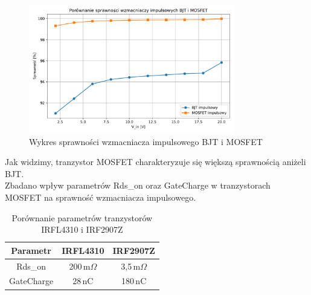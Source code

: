 \documentclass[11pt]{article}
\begin{document}
\begin{figure}[H]
\centering
\includegraphics[width=0.8\textwidth]{aun1_imp_bjt_vs_mosfet.pdf}
\caption{Wykres sprawności wzmacniacza impulsowego BJT i MOSFET}
\end{figure}

Jak widzimy, tranzystor MOSFET charakteryzuje się większą sprawnością aniżeli BJT.\\

Zbadano wpływ parametrów Rds\_on oraz GateCharge w tranzystorach MOSFET
na sprawność wzmacniacza impulsowego. \\ 

\begin{table}[H]
\centering
\begin{tabular}{|c|c|c|}
\hline
\textbf{Parametr} & \textbf{IRFL4310} & \textbf{IRF2907Z} \\
\hline
Rds\_on & 200\,m\(\Omega\) & 3,5\,m\(\Omega\) \\
\hline
GateCharge & 28\,nC & 180\,nC \\
\hline
\end{tabular}

\caption{Porównanie parametrów tranzystorów IRFL4310 i IRF2907Z}
\end{table}
\end{document}
